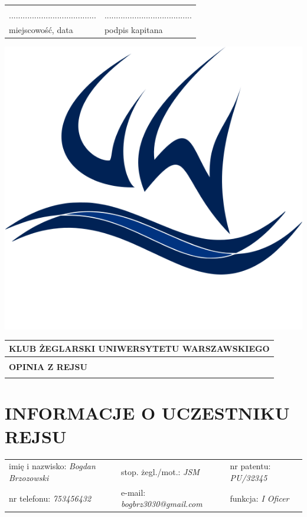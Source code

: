 \documentclass{article}
\begin{document}
\begin{tabularx}{\textwidth}{X X}
\\\\
...................................... & ......................................\\
miejscowość, data & podpis kapitana\\
\end{tabularx}
\newpage
\begin{minipage}{0.11\textwidth}
\includegraphics[width=\textwidth]{logo.png}
\end{minipage}
\begin{minipage}{0.89\textwidth}
\begin{tabularx}{\textwidth} { 
  | >{\centering\arraybackslash}X | }
 \hline
 \textbf{KLUB ŻEGLARSKI UNIWERSYTETU WARSZAWSKIEGO} \\
 \hline
 \\
 \textbf{\huge OPINIA Z REJSU} \\
 \\
\hline
\end{tabularx}
\end{minipage}

\section*{INFORMACJE O UCZESTNIKU REJSU}
\begin{tabularx}{\textwidth}{X X X}
imię i nazwisko: \textit{Bogdan Brzozowski} & stop. żegl./mot.: \textit{JSM} & nr patentu: \textit{PU/32345} \\
nr telefonu: \textit{753456432} & e-mail: \textit{bogbrz3030@gmail.com} & funkcja: \textit{I Oficer} \\
\end{tabularx}
\end{document}
